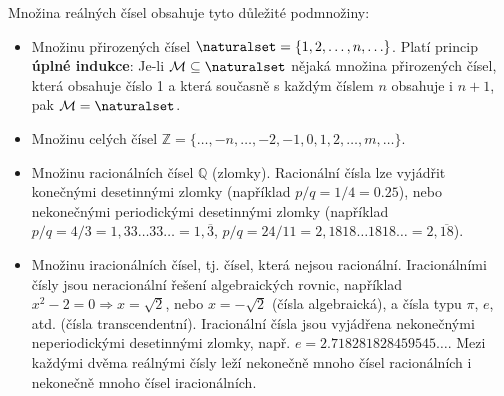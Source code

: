       Množina reálných čísel obsahuje tyto důležité podmnožiny:
      \begin{itemize}[noitemsep]
        \item Množinu přirozených čísel \(\naturalset = \{1, 2, \ldots, n, \ldots\}\). Platí 
              princip \textbf{úplné indukce}: Je-li \(\mathcal{M} \subseteq \naturalset\) nějaká 
              množina přirozených čísel, která obsahuje číslo \num{1} a která současně s každým 
              číslem \(n\) obsahuje i \(n + 1\), pak \(\mathcal{M} = \naturalset\).
        \item Množinu celých čísel \newline\(\mathbb{Z} = \{\ldots, -n, \ldots,
              -2, -1, 0, 1, 2, \ldots, m, \ldots\}\).
        \item Množinu racionálních čísel \(\mathbb{Q}\) (zlomky). Racionální čísla lze vyjádřit 
              konečnými desetinnými zlomky (například \(p/q = 1/4 = \num{0.25}\)), nebo nekonečnými 
              periodickými desetinnými zlomky (například \(p/q = 4/3 = 1,33\ldots33\ldots = 
              1,\overline{3}\), \(p/q = 24/11 = 2,1818\ldots1818\ldots = 2,\overline{18}\)).
        \item Množinu iracionálních čísel, tj. čísel, která nejsou racionální. Iracionálními čísly 
              jsou neracionální řešení algebraických rovnic, například \(x^2 - 2 = 0 \Rightarrow x 
              = \sqrt{2}\), nebo \(x = - \sqrt{2}\) (čísla algebraická), a čísla typu \(\pi\), 
              \(e\), atd. (čísla transcendentní). Iracionální čísla jsou vyjádřena       
              nekonečnými neperiodickými desetinnými zlomky, např. 
              \(e = \num{2.718281828459545}\ldots\). Mezi každými dvěma reálnými čísly leží 
              nekonečně mnoho čísel racionálních i nekonečně mnoho čísel iracionálních.
      \end{itemize}
      
